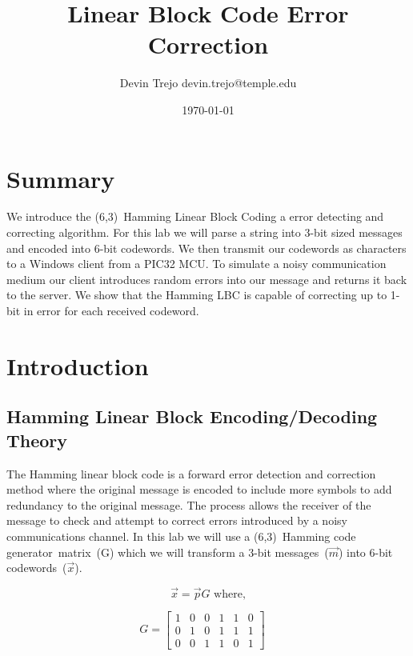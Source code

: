 \documentclass[12pt]{article}
\begin{document}
\title{Linear Block Code Error Correction}
\author{Devin Trejo \tabularnewline devin.trejo@temple.edu }
\date{\today}
\maketitle

\section{Summary}
\label{sect:summary}
We introduce the (6,3)~Hamming Linear Block Coding a error detecting and 
correcting algorithm. For this lab we will parse a string into 3-bit sized
messages and encoded into 6-bit codewords. We then transmit our codewords
as characters to a Windows client from a PIC32 MCU. To simulate a noisy
communication medium our client introduces random errors into our message
and returns it back to the server. We show that the Hamming LBC is capable
of correcting up to 1-bit in error for each received codeword.

\section{Introduction}
\label{sect:intro}
\subsection{Hamming Linear Block Encoding/Decoding Theory}
\label{sec:theory}
The Hamming linear block code is a forward error detection and correction 
method where the original message is encoded to include more symbols to 
add redundancy to the original message. The process allows the receiver of
the message to check and attempt to correct errors introduced by a 
noisy communications channel. In this lab we will use a (6,3)~Hamming code
generator~matrix~(G) which we will transform a 3-bit messages~($\vec{m}$) 
into 6-bit codewords~($\vec{x}$).

\begin{equation}
    \vec{x}=\vec{p}G \text{ where,}
    \label{eq:encoder}
\end{equation}

$$
    G=
    \begin{bmatrix}
        1 & 0 & 0 & 1 & 1 & 0 \\
        0 & 1 & 0 & 1 & 1 & 1 \\
        0 & 0 & 1 & 1 & 0 & 1
    \end{bmatrix} \quad
$$
\end{document}
